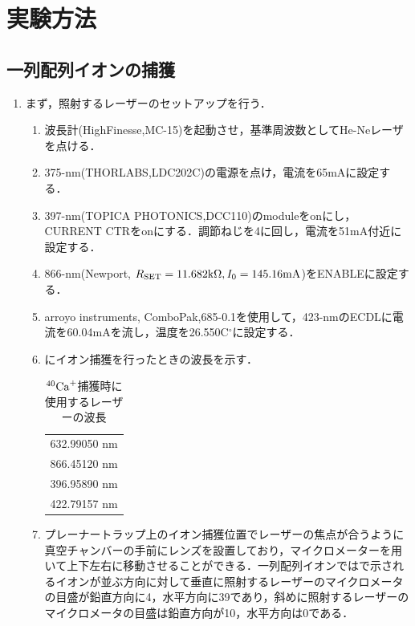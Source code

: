 \chapter{実験方法}
\section{一列配列イオンの捕獲}
\begin{enumerate}
\item まず，照射するレーザーのセットアップを行う．
\begin{enumerate}
\item 波長計(HighFinesse,MC-15)を起動させ，基準周波数としてHe-Neレーザを点ける．
\item 375-nm(THORLABS,LDC202C)の電源を点け，電流を65mAに設定する．
\item 397-nm(TOPICA PHOTONICS,DCC110)のmoduleをonにし，CURRENT CTRをonにする．調節ねじを4に回し，電流を51mA付近に設定する．
\item 866-nm(Newport, $R_{\rm SET} = 11.682 {\rm k}\Omega , I_{0} = 145.16{\rm mA}$)をENABLEに設定する．
\item arroyo instruments, ComboPak,685-0.1を使用して，423-nmのECDLに電流を60.04mAを流し，温度を26.550C$^{\circ}$に設定する．
\item {}にイオン捕獲を行ったときの波長を示す．

\begin{table}[h]
	\centering
		\caption{$^{40}{\rm Ca}^+$捕獲時に使用するレーザーの波長}
		\label{tab:use_laser_wavelength}
		\begin{tabular}{c}\hline \hline
			632.99050 nm \\
			866.45120 nm \\
			396.95890 nm \\
			422.79157 nm \\ \hline
		\end{tabular}
\end{table}

\item プレーナートラップ上のイオン捕獲位置でレーザーの焦点が合うように真空チャンバーの手前にレンズを設置しており，マイクロメーターを用いて上下左右に移動させることができる．一列配列イオンではで示されるイオンが並ぶ方向に対して垂直に照射するレーザーのマイクロメータの目盛が鉛直方向に4，水平方向に39であり，斜めに照射するレーザーのマイクロメータの目盛は鉛直方向が10，水平方向は0である．


\end{enumerate}
\end{enumerate}
